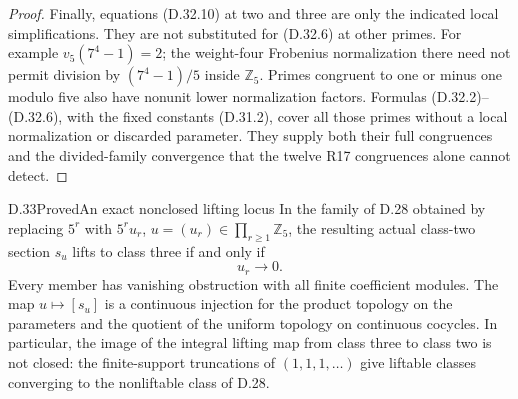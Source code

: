 \begin{proof}
Finally, equations (D.32.10) at two and three
are only the indicated local simplifications.
They are not substituted for (D.32.6) at other
primes. For example \(v_5(7^4-1)=2\); the
weight-four Frobenius normalization there need
not permit division by \((7^4-1)/5\) inside
\(\mathbb Z_5\). Primes congruent to one or
minus one modulo five also have nonunit lower
normalization factors. Formulas
(D.32.2)--(D.32.6), with the fixed constants
(D.31.2), cover all those primes without a
local normalization or discarded parameter.
They supply both their full congruences and
the divided-family convergence that the
twelve R17 congruences alone cannot detect.
\end{proof}



\begin{statement}{D.33}{Proved}{An exact nonclosed lifting locus}
In the family of D.28 obtained by replacing
\(5^r\) with \(5^ru_r\),
\(u=(u_r)\in\prod_{r\ge1}\mathbb Z_5\),
the resulting actual class-two section \(s_u\)
lifts to class three if and only if
\[
                         u_r\longrightarrow0.             \tag{D.33.1}
\]
Every member has vanishing obstruction with
all finite coefficient modules. The map
\(u\mapsto[s_u]\) is a continuous injection
for the product topology on the parameters
and the quotient of the uniform topology on
continuous cocycles. In particular, the image
of the integral lifting map from class three
to class two is not closed: the finite-support
truncations of \((1,1,1,\ldots)\) give
liftable classes converging to the nonliftable
class of D.28.
\end{statement}
